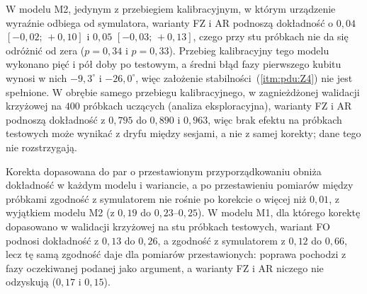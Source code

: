W modelu M2, jedynym z przebiegiem kalibracyjnym, w którym urządzenie wyraźnie odbiega od symulatora, warianty FZ i AR podnoszą dokładność o $0{,}04$ $[-0{,}02;\,+0{,}10]$ i $0{,}05$ $[-0{,}03;\,+0{,}13]$, czego przy stu próbkach nie da się odróżnić od zera ($p=0{,}34$ i $p=0{,}33$).
Przebieg kalibracyjny tego modelu wykonano pięć i pół doby po testowym, a średni błąd fazy pierwszego kubitu wynosi w nich $-9{,}3^{\circ}$ i $-26{,}0^{\circ}$, więc założenie stabilności~(\ref{itm:pdu:Z4}) nie jest spełnione.
W obrębie samego przebiegu kalibracyjnego, w zagnieżdżonej walidacji krzyżowej na $400$ próbkach uczących (analiza eksploracyjna), warianty FZ i AR podnoszą dokładność z $0{,}795$ do $0{,}890$ i $0{,}963$, więc brak efektu na próbkach testowych może wynikać z dryfu między sesjami, a nie z samej korekty; dane tego nie rozstrzygają.

Korekta dopasowana do par o przestawionym przyporządkowaniu obniża dokładność w każdym modelu i wariancie, a po przestawieniu pomiarów między próbkami zgodność z symulatorem nie rośnie po korekcie o więcej niż $0{,}01$, z wyjątkiem modelu M2 (z $0{,}19$ do $0{,}23$--$0{,}25$).
W modelu M1, dla którego korektę dopasowano w walidacji krzyżowej na stu próbkach testowych, wariant FO podnosi dokładność z $0{,}13$ do $0{,}26$, a zgodność z symulatorem z $0{,}12$ do $0{,}66$, lecz tę samą zgodność daje dla pomiarów przestawionych: poprawa pochodzi z fazy oczekiwanej podanej jako argument, a warianty FZ i AR niczego nie odzyskują ($0{,}17$ i $0{,}15$).

